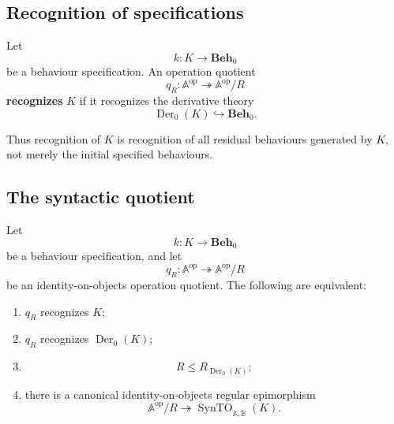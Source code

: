 \subsection{Recognition of specifications}
\label{subsec:to-recognition-specifications}

\begin{definition}
\label{def:to-operation-quotient-recognizes-specification}
    Let
    \[
        k:K\to\mathbf{Beh}_0
    \]
    be a behaviour specification. An operation quotient
    \[
        q_R:
        \mathbb A^{\mathrm{op}}
        \twoheadrightarrow
        \mathbb A^{\mathrm{op}}/R
    \]
    \textbf{recognizes} \(K\) if it recognizes the derivative theory
    \[
        \operatorname{Der}_0(K)\hookrightarrow\mathbf{Beh}_0.
    \]
\end{definition}

Thus recognition of \(K\) is recognition of all residual behaviours generated
by \(K\), not merely the initial specified behaviours.

\subsection{The syntactic quotient}
\label{subsec:to-syntactic-universal-property}

\begin{theorem}
\label{thm:to-syntactic-universal-property}
    Let
    \[
        k:K\to\mathbf{Beh}_0
    \]
    be a behaviour specification, and let
    \[
        q_R:
        \mathbb A^{\mathrm{op}}
        \twoheadrightarrow
        \mathbb A^{\mathrm{op}}/R
    \]
    be an identity-on-objects operation quotient. The following are equivalent:
    \begin{enumerate}
        \item \(q_R\) recognizes \(K\);
        \item \(q_R\) recognizes \(\operatorname{Der}_0(K)\);
        \item
        \[
            R\leq R_{\operatorname{Der}_0(K)};
        \]
        \item there is a canonical identity-on-objects regular epimorphism
        \[
            \mathbb A^{\mathrm{op}}/R
            \twoheadrightarrow
            \operatorname{SynTO}_{\mathbb A,\mathbb B}(K).
        \]
    \end{enumerate}
\end{theorem}

